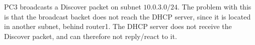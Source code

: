 PC3 broadcasts a Discover packet on subnet $10.0.3.0/24$. The problem with this is that the broadcast backet does not reach the DHCP server, since it is located in another subnet, behind router1. The DHCP server does not receive the Discover packet, and can therefore not reply/react to it.
